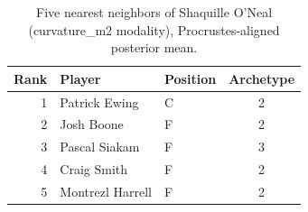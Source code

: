 \begin{table}[htbp]
  \centering\small
  \begin{tabular}{rllc}
    \toprule
    Rank & Player & Position & Archetype \\
    \midrule
    1 & Patrick Ewing & C & 2 \\
    2 & Josh Boone & F & 2 \\
    3 & Pascal Siakam & F & 3 \\
    4 & Craig Smith & F & 2 \\
    5 & Montrezl Harrell & F & 2 \\
    \bottomrule
  \end{tabular}
  \caption{Five nearest neighbors of Shaquille O'Neal (curvature_m2 modality), Procrustes-aligned posterior mean.}
  \label{tab:Shaquille_O_Neal_neighbors_curvature_m2}
\end{table}

